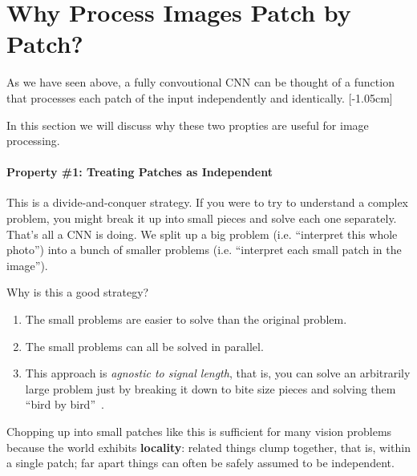 \section{Why Process Images Patch by Patch?}\label{sec:convolutional_neural_nets:key_properties}

As we have seen above, a fully convoutional CNN can be thought of a function that processes each patch of the input independently and identically. [-1.05cm]%


In this section we will discuss why these two propties are useful for image processing.

\paragraph*{Property \#1: Treating Patches as Independent}
This is a divide-and-conquer strategy. If you were to try to understand a complex problem, you might break it up into small pieces and solve each one separately. That's all a CNN is doing. We split up a big problem (i.e. ``interpret this whole photo'') into a bunch of smaller problems (i.e. ``interpret each small patch in the image'').

Why is this a good strategy?
\begin{enumerate}
    \item The small problems are easier to solve than the original problem.
    \item The small problems can all be solved in parallel.
    \item This approach is \textit{agnostic to signal length}, that is, you can solve an arbitrarily large problem just by breaking it down to bite size pieces and solving them ``bird by bird''~\cite{lamott1980}.
\end{enumerate}

Chopping up into small patches like this is sufficient for many vision problems because the world exhibits {\bf locality}: related things clump together, that is, within a single patch; far apart things can often be safely assumed to be independent.


